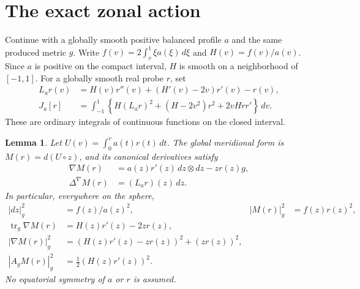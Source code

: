 \documentclass[11pt]{article}
\newtheorem{lemma}[theorem]{Lemma}
\begin{document}
\section{The exact zonal action}

Continue with a globally smooth positive balanced profile $a$ and the same
produced metric $g$. Write $f(v)=2\int_v^1\xi a(\xi)\,d\xi$ and
$H(v)=f(v)/a(v)$. Since $a$ is positive on the compact interval,
$H$ is smooth on a neighborhood of $[-1,1]$. For a globally smooth
real probe $r$, set
\begin{align}
 L_a r(v)&=H(v)r''(v)+(H'(v)-2v)r'(v)-r(v),\label{eq:meridional-operator}\\
 J_a[r]&=\int_{-1}^1\left\{
 H(L_a r)^2+(H-2v^2)r^2+2vHrr'\right\}\,dv.
 \label{eq:meridional-action}
\end{align}
These are ordinary integrals of continuous functions on the closed interval.

\begin{lemma}\label{lem:meridional-derivatives}
Let $U(v)=\int_0^v a(t)r(t)\,dt$. The global meridional form is
$M(r)=d(U\circ z)$, and its canonical derivatives satisfy
\begin{align}
 \nabla M(r)&=a(z)r'(z)\,dz\otimes dz-zr(z)g,
 \label{eq:meridional-first}\\
 \Delta^\nabla M(r)&=(L_a r)(z)\,dz.
 \label{eq:meridional-rough}
\end{align}
In particular, everywhere on the sphere,
\begin{align*}
 |dz|_g^2&=f(z)/a(z)^2, & |M(r)|_g^2&=f(z)r(z)^2,\\
 \operatorname{tr}_g\nabla M(r)&=H(z)r'(z)-2zr(z),\\
 |\nabla M(r)|_g^2&=(H(z)r'(z)-zr(z))^2+(zr(z))^2,\\
 |A_gM(r)|_g^2&=\tfrac12(H(z)r'(z))^2.
\end{align*}
No equatorial symmetry of $a$ or $r$ is assumed.
\end{lemma}
\end{document}
